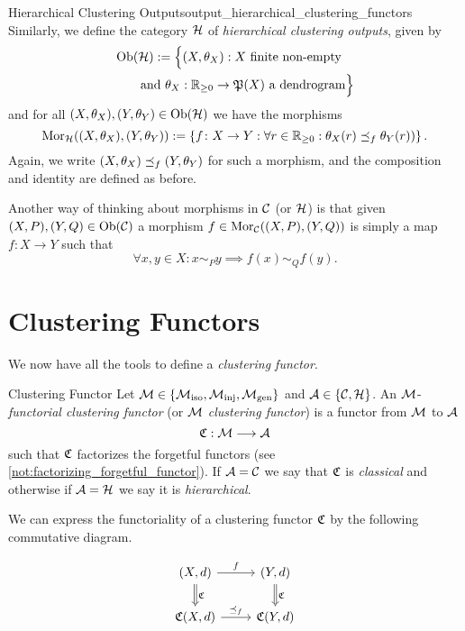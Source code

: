 \begin{definition}{Hierarchical Clustering Outputs\cite[Def.~3.3]{Carlsson2010}}{output_hierarchical_clustering_functors}
Similarly, we define the category $\mathcal{H}$ of \emph{hierarchical clustering outputs}, given by
\begin{equation*}
\begin{multlined}[c][.8\displaywidth]
    \ob(\H) := \Big\{(X, \theta_X): X \text{ finite non-empty} \\ \text{and } \theta_X: \R_{\geq0} \to \P(X) \ \text{a dendrogram}\Big\}
\end{multlined}
\end{equation*}
and for all $(X, \theta_X), (Y, \theta_Y) \in \mathrm {Ob}(\mathcal{H})$ we have the morphisms
\begin{equation*}
    \mathrm {Mor}_{\mathcal{H}}((X, \theta_X), (Y,\theta_Y)) :=
    \left\{f\colon X \to Y: \forall r \in \mathbb R_{\geq0}: \theta_X(r) \preceq_f \theta_Y(r)) \right\}.
\end{equation*}
Again, we write $(X, \theta_X) \preceq_f (Y, \theta_Y)$ for such a morphism, and the composition and identity are defined as before.
\end{definition}

Another way of thinking about morphisms in $\mathcal{C}$ (or $\mathcal{H}$) is that given ${(X,P), (Y,Q) \in \mathrm {Ob}(\mathcal{C})}$ a morphism $f \in \mathrm {Mor}_{\mathcal{C}}((X,P), (Y,Q))$ is simply a map $f\colon X \to Y$ such that
$$
\forall x,y \in X: x \sim_P y \implies f(x) \sim_Q f(y).
$$

\section{Clustering Functors}
We now have all the tools to define a \emph{clustering functor}.

\begin{definition}{Clustering Functor \cite[Sec.~4.1]{Carlsson2010}}{}
Let $\mathcal{M} \in \{{\mathcal{M}_\mathrm{iso}}, {\mathcal{M}_\mathrm{inj}}, {\mathcal{M}_\mathrm{gen}}\}$ and $\mathcal{A} \in \{\mathcal{C}, \mathcal{H}\}$. An $\mathcal{M}$-\emph{functorial clustering functor} (or $\mathcal{M}$ \emph{clustering functor}) is a functor from $\mathcal{M}$ to $\mathcal{A}$
$$\mathfrak{C} : \mathcal{M} \longrightarrow \mathcal{A}$$
such that $\mathfrak{C}$ factorizes the forgetful functors (see \ref{not:factorizing_forgetful_functor}). If $\mathcal{A} = \mathcal{C}$ we say that $\mathfrak{C}$ is \emph{classical} and otherwise if $\mathcal{A} = \mathcal{H}$ we say it is \emph{hierarchical}.
\end{definition}

We can express the functoriality of a clustering functor $\mathfrak{C}$ by the following commutative diagram.

\begin{equation*}
    \begin{tikzcd}
    {(X,d)} \arrow[r, "f"] \arrow[d, "\Cf", Rightarrow] & {(Y,d)} \arrow[d, "\Cf", Rightarrow] \\
    {\Cf(X,d)} \arrow[r, "\refines_f"]                  & {\Cf(Y,d)}
    \end{tikzcd}
\end{equation*}


